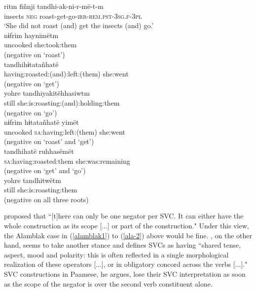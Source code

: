 \ea 
{}
\ea \label{alamblak1}
\gll ritm fiñnji tandhi-ak-ni-r-më-t-m \\
insects \textsc{neg} roast-get-go-\textsc{irr}-\textsc{rem}.\textsc{pst}-\textsc{3}\textsc{sg}.\textsc{f}-\textsc{3}\textsc{pl} \\
\glft `She did not roast (and) get the insects (and) go.' \\ 
\ex \label{ala-1}
\gll nɨfrim haynimëtm \\
uncooked she:took:them \\
\glft (negative on `roast') \\ 
\ex
\gll tandhihɨtatañhatë \\
having:roasted:(and):left:(them) she:went \\
\glft (negative on `get') \\ 
\ex
\gll yohre tandhiyakitëhhasiwtm \\
still she:is:roasting:(and):holding:them \\
\glft (negative on `go') \\ 
\ex
\gll nɨfrim hɨtatañhatë yimët \\
uncooked \textsc{sa}:having:left:(them) she:went \\
\glft (negative on `roast' and `get') \\ 
\ex
\gll tandhihatë ruhhasëmët \\
\textsc{sa}:having:roasted:them she:was:remaining \\
\glft (negative on `get' and `go') \\ 
\ex \label{ala-2}
\gll yohre tandhitwëtm \\ 
still she:is:roasting:them \\
\glft (negative on all three roots)\\ 
\z
\z

\citet{Aikhenvald2006} proposed that ``[t]here can only be one negator per SVC. It can either have the whole construction as its scope [...] or part of the construction." Under this view, the Alamblak case in (\ref{alamblak1}) to (\ref{ala-2}) above would be fine. \citet[293]{Durie1997}, on the other hand, seems to take another stance and defines SVCs as having ``shared tense, aspect, mood and polarity: this is often reflected in a single morphological realization of these operators [...], or in obligatory concord across the verbs [...]." SVC constructions in Paamese, he argues, lose their SVC interpretation as soon as the scope of the negator is over the second verb constituent alone.

